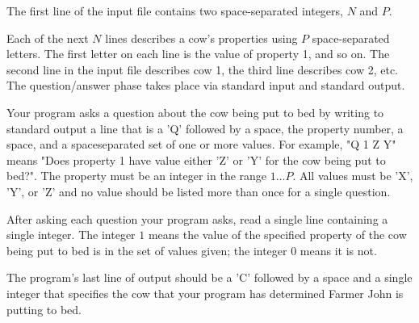 The first line of the input file contains two space-separated integers, $N$ and $P$.

Each of the next $N$ lines describes a cow's properties using $P$ space-separated letters. The first letter on each line is the value of property 1, and so on. The second line in the input file describes cow 1, the third line describes cow 2, etc.
The question/answer phase takes place via standard input and standard output.

Your program asks a question about the cow being put to bed by writing to standard output a line that is a 'Q' followed by a space, the property number, a space, and a  spaceseparated set of one or more values. For example, "Q 1 Z Y" means "Does property 1 have value either 'Z' or 'Y' for the cow being put to bed?". The property must be an
integer in the range $1 \ldots P$. All values must be 'X', 'Y', or 'Z' and no value should be listed more than once for a single question.

After asking each question your program asks, read a single line containing a single integer. The integer $1$ means the value of the specified property of the cow being put to bed is in the set of values given; the integer $0$ means it is not. 

The program's last line of output should be a 'C' followed by a space and a single integer that specifies the cow that your program has determined Farmer John is putting to bed.